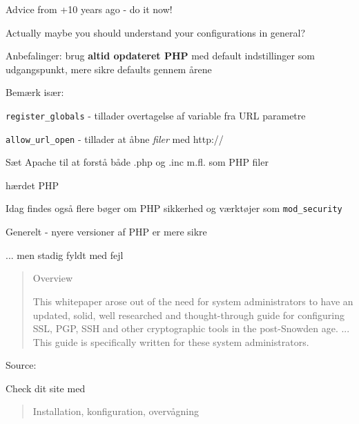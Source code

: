 \documentclass[20pt,landscape,a4paper,footrule]{foils}
\begin{document}
\centerline{Advice from +10 years ago - do it now!}

Actually maybe you should understand your configurations in general?


\begin{list1}
\item Anbefalinger: brug {\bf altid opdateret PHP} med default indstillinger
  som udgangspunkt, mere sikre defaults gennem årene
\item Bemærk især:

\begin{list2}
\item \verb+register_globals+ - tillader overtagelse af variable fra
  URL parametre
\item \verb+allow_url_open+ - tillader at åbne \emph{filer} med http://
\item Sæt Apache til at forstå både .php og .inc m.fl. som PHP filer
\end{list2}
\item hærdet PHP 
\item Idag findes også flere bøger om PHP sikkerhed og værktøjer som \verb+mod_security+
 \end{list1}

\centerline{Generelt - nyere versioner af PHP er mere sikre}

... men stadig fyldt med fejl \smiley


\begin{quote}
Overview

This whitepaper arose out of the need for system administrators to have an updated, solid, well researched and thought-through guide for configuring SSL, PGP, SSH and other cryptographic tools in the post-Snowden age. ... This guide is specifically written for these system administrators.
\end{quote}

Source: 

Check dit site med 



\begin{quote}\Large
Installation, konfiguration, overvågning
\end{quote}
\end{document}

